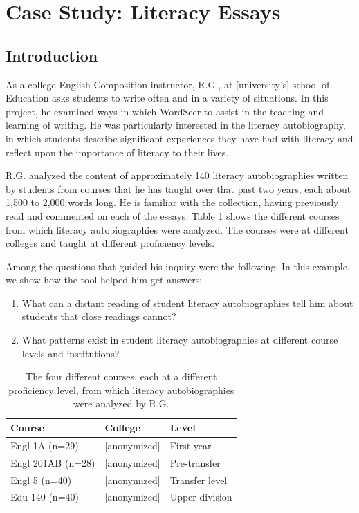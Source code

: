 \documentclass{sig-alternate}
\begin{document}
\section{Case Study: Literacy Essays}

\subsection{Introduction}
As a college English Composition instructor,  R.G., at  [university's] school of Education asks students to write often and in a variety of situations. In this project, he examined ways in which WordSeer to assist in the teaching and learning of writing. He was particularly interested in the literacy autobiography, in which students describe significant experiences they have had with literacy and reflect upon the importance of literacy to their lives.  

R.G. analyzed the content of approximately 140 literacy autobiographies written by students from courses that he has taught over that past two years, each about 1,500 to 2,000 words long. He is familiar with the collection, having previously read and commented on each of the essays.  Table \ref{table:rex-courses} shows the different courses from which literacy autobiographies were analyzed. The courses were at different colleges and taught at different proficiency levels.

Among the questions that guided his inquiry were the following. In this example, we show how the tool helped him get answers:
\begin{enumerate}
\item What can a distant reading of student literacy autobiographies tell him about students that close readings cannot?
\item What patterns exist in student literacy autobiographies at different course levels and institutions?
\end{enumerate}

\begin{table}
\begin{tabular}{lll}
Course& College & Level \\
\hline
Engl 1A (n=29) & [anonymized] & First-year \\
Engl 201AB (n=28) & [anonymized] & Pre-transfer \\
Engl 5 (n=40) & [anonymized] & Transfer level \\
Edu 140 (n=40) & [anonymized] & Upper division \\
\end{tabular}
\caption{The four different courses, each at a different proficiency level, from which literacy autobiographies were analyzed by R.G. \label{table:rex-courses}}
\end{table}
\end{document}
